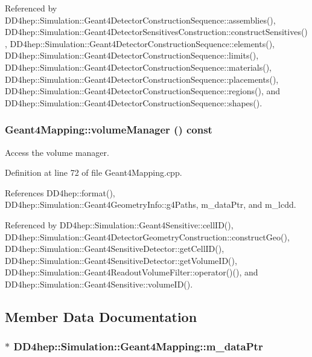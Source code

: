 Referenced by DD4hep::Simulation::Geant4DetectorConstructionSequence::assemblies(), DD4hep::Simulation::Geant4DetectorSensitivesConstruction::constructSensitives(), DD4hep::Simulation::Geant4DetectorConstructionSequence::elements(), DD4hep::Simulation::Geant4DetectorConstructionSequence::limits(), DD4hep::Simulation::Geant4DetectorConstructionSequence::materials(), DD4hep::Simulation::Geant4DetectorConstructionSequence::placements(), DD4hep::Simulation::Geant4DetectorConstructionSequence::regions(), and DD4hep::Simulation::Geant4DetectorConstructionSequence::shapes().\hypertarget{class_d_d4hep_1_1_simulation_1_1_geant4_mapping_adee7ce5478c0903bb899de5e30268d5e}{
\subsubsection[{volumeManager}]{ Geant4Mapping::volumeManager () const}}
\label{class_d_d4hep_1_1_simulation_1_1_geant4_mapping_adee7ce5478c0903bb899de5e30268d5e}


Access the volume manager. 

Definition at line 72 of file Geant4Mapping.cpp.

References DD4hep::format(), DD4hep::Simulation::Geant4GeometryInfo::g4Paths, m\_\-dataPtr, and m\_\-lcdd.

Referenced by DD4hep::Simulation::Geant4Sensitive::cellID(), DD4hep::Simulation::Geant4DetectorGeometryConstruction::constructGeo(), DD4hep::Simulation::Geant4SensitiveDetector::getCellID(), DD4hep::Simulation::Geant4SensitiveDetector::getVolumeID(), DD4hep::Simulation::Geant4ReadoutVolumeFilter::operator()(), and DD4hep::Simulation::Geant4Sensitive::volumeID().

\subsection{Member Data Documentation}
\hypertarget{class_d_d4hep_1_1_simulation_1_1_geant4_mapping_a93f0104487f0ff971b9b72777e287c75}{
\subsubsection[{m\_\-dataPtr}]{$\ast$ {\bf DD4hep::Simulation::Geant4Mapping::m\_\-dataPtr}}}
\label{class_d_d4hep_1_1_simulation_1_1_geant4_mapping_a93f0104487f0ff971b9b72777e287c75}


